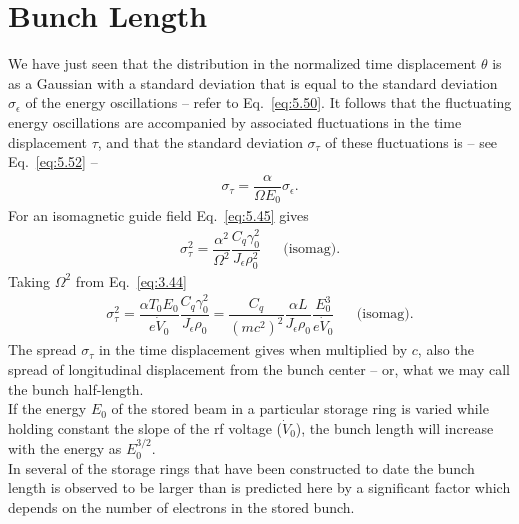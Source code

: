 \section{Bunch Length}\label{sec:5.4}

We have just seen that the distribution in the normalized time displacement $\theta$ is as a Gaussian with a standard deviation that is equal to the standard deviation $\sigma_\epsilon$ of the energy oscillations -- refer to Eq.~\eqref{eq:5.50}. It follows that the fluctuating energy oscillations are accompanied by associated fluctuations in the time displacement $\tau$, and that the standard deviation $\sigma_\tau$ of these fluctuations is -- see Eq.~\eqref{eq:5.52} --
\begin{align}
	\sigma_\tau = \dfrac{\alpha}{\Omega E_0} \sigma_\epsilon.
\end{align}
For an isomagnetic guide field Eq.~\eqref{eq:5.45} gives
\begin{align}
	\sigma_\tau^2 = \dfrac{\alpha^2}{\Omega^2} \dfrac{C_q \gamma_0^2}{J_\epsilon \rho_0^2} && \text{(isomag).}
\end{align}
Taking $\Omega^2$ from Eq.~\eqref{eq:3.44}
\begin{align}
	\sigma_\tau^2 = \dfrac{\alpha T_0 E_0}{e\dot{V}_0} \dfrac{C_q \gamma_0^2}{J_\epsilon \rho_0} = \dfrac{C_q}{(mc^2)^2} \dfrac{\alpha L}{J_\epsilon \rho_0} \dfrac{E_0^3}{e \dot{V}_0} && \text{(isomag).}
\end{align}
The spread $\sigma_\tau$ in the time displacement gives when multiplied by $c$, also the spread
of longitudinal displacement from the bunch center -- or, what we may call the bunch half-length.\\
If the energy $E_0$ of the stored beam in a particular storage ring is varied while holding constant the slope of the rf voltage ($\dot{V}_0$), the bunch length will increase with the energy as $E_0^{3/2}$.\\
In several of the storage rings that have been constructed to date the bunch length is observed to be larger than is predicted here by a significant factor which depends on the number of electrons
 in the stored bunch.

